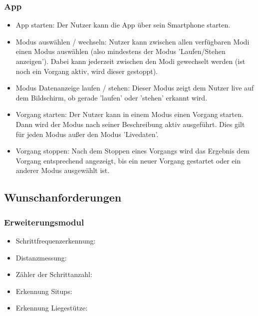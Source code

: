 \documentclass[a4paper,12pt]{article}
\begin{document}
    \subsubsection{App}
    \begin{itemize}
      \item[] \textsf{App starten:} Der Nutzer kann die App über sein Smartphone starten.
      \item[] \textsf{Modus auswählen / wechseln:} Nutzer kann zwischen allen verfügbaren Modi einen Modus auswählen (also mindestens der Modus 'Laufen/Stehen anzeigen'). Dabei kann jederzeit zwischen den Modi gewechselt werden (ist noch ein Vorgang aktiv, wird dieser gestoppt).
      \item[] \textsf{Modus Datenanzeige laufen / stehen:} Dieser Modus zeigt dem Nutzer live auf dem Bildschirm, ob gerade 'laufen' oder 'stehen' erkannt wird.
      \item[] \textsf{Vorgang starten:} Der Nutzer kann in einem Modus einen Vorgang starten. Dann wird der Modus nach seiner Beschreibung aktiv ausgeführt. Dies gilt für jeden Modus außer den Modus 'Livedaten'.
      \item[] \textsf{Vorgang stoppen:} Nach dem Stoppen eines Vorgangs wird das Ergebnis dem Vorgang entsprechend angezeigt, bis ein neuer Vorgang gestartet oder ein anderer Modus ausgewählt ist.  
    \end{itemize}
  \subsection{Wunschanforderungen}
    \subsubsection{Erweiterungsmodul}
    \begin{itemize}
      
      \item[] \textsf{Schrittfrequenzerkennung:}
      \item[] \textsf{Distanzmessung:}
      \item[] \textsf{Zähler der Schrittanzahl:}
      \item[] \textsf{Erkennung Situps:}
      \item[] \textsf{Erkennung Liegestütze:}   
    \end{itemize}
\end{document}
